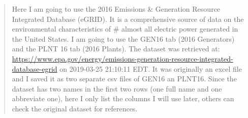 \documentclass[12pt,]{article}
\begin{document}
\begin{quote}
Here I am going to use the 2016 Emissions \& Generation Resource
Integrated Database (eGRID). It is a comprehensive source of data on the
environmental characteristics of \# almost all electric power generated
in the United States. I am going to use the GEN16 tab (2016 Generators)
and the PLNT 16 tab (2016 Plants). The dataset was retrieved at:
\url{https://www.epa.gov/energy/emissions-generation-resource-integrated-database-egrid}
on 2019-03-25 21:10:11 EDT. It was originally an excel file and I saved
it as two separate csv files of GEN16 an PLNT16. Since the dataset has
two names in the first two rows (one full name and one abbreviate one),
here I only list the columns I will use later, others can check the
original dataset for references.
\end{quote}
\end{document}
